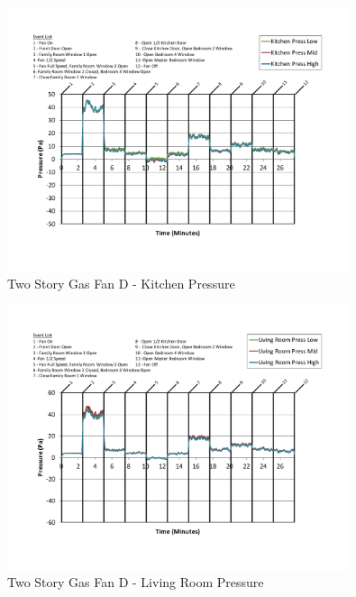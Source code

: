\documentclass{article}
\begin{document}
\begin{appendices}
	\begin{figure}[H]
		\centering
		\includegraphics[height=3.05in,trim=0.67in 1.1in 0.67in 0.8in,clip=true]{0_Images/Results_Charts/ColdFlow/Two_Story/Gas/D/Kitchen_Pressure.pdf}
		\caption{Two Story Gas Fan D - Kitchen Pressure}
	\end{figure}
 

	\begin{figure}[H]
		\centering
		\includegraphics[height=3.05in,trim=0.67in 1.1in 0.67in 0.8in,clip=true]{0_Images/Results_Charts/ColdFlow/Two_Story/Gas/D/Living_Room_Pressure.pdf}
		\caption{Two Story Gas Fan D - Living Room Pressure}
	\end{figure}
 
	\clearpage


\end{appendices}
\end{document}
